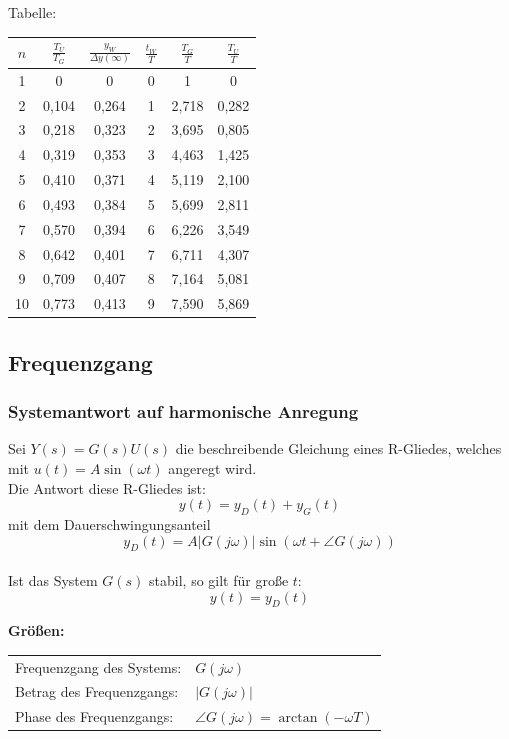 \documentclass[10pt,a4paper]{article}
\begin{document}
Tabelle: \\
\begin{tabular}{|c|c|c|c|c|c|}
	\hline
	$n$ & $\frac{T_U}{T_G}$ & $\frac{y_W}{\Delta y(∞)}$ & $\frac{t_W}{T}$ & $\frac{T_G}{T}$ & $\frac{T_U}{T}$ \\
	\hline
	1 & 0 & 0 & 0 & 1 & 0 \\
	\hline
	2 & 0,104 & 0,264 & 1 & 2,718 & 0,282 \\
	\hline
	3 & 0,218 & 0,323 & 2 & 3,695 & 0,805 \\
	\hline
	4 & 0,319 & 0,353 & 3 & 4,463 & 1,425 \\
	\hline
	5 & 0,410 & 0,371 & 4 & 5,119 & 2,100 \\
	\hline
	6 & 0,493 & 0,384 & 5 & 5,699 & 2,811 \\
	\hline
	7 & 0,570 & 0,394 & 6 & 6,226 & 3,549 \\
	\hline
	8 & 0,642 & 0,401 & 7 & 6,711 & 4,307 \\
	\hline
	9 & 0,709 & 0,407 & 8 & 7,164 & 5,081 \\
	\hline
	10 & 0,773 & 0,413 & 9 & 7,590 & 5,869 \\
	\hline
\end{tabular}

\subsection{Frequenzgang}
\subsubsection{Systemantwort auf harmonische Anregung}
Sei $Y(s) = G(s)U(s)$ die beschreibende Gleichung eines R-Gliedes, welches mit $u(t) = A\sin(\omega t)$ angeregt wird. \\
Die Antwort diese R-Gliedes ist:
$$
	y(t) = y_D(t) + y_G(t)
$$
mit dem Dauerschwingungsanteil
$$
	y_D(t) = A|G(j\omega)| \sin(\omega t + \angle G(j \omega))
$$ \\

Ist das System $G(s)$ stabil, so gilt für große $t$:
$$
	y(t) = y_D(t)
$$

\textbf{Größen:} \\
\begin{tabular}{ll}
	Frequenzgang des Systems: & $G(j \omega)$ \\
	Betrag des Frequenzgangs: & $|G(j \omega)|$ \\
	Phase des Frequenzgangs: & $\angle G(j \omega) = \arctan(-\omega T)$
\end{tabular} \\
\end{document}
